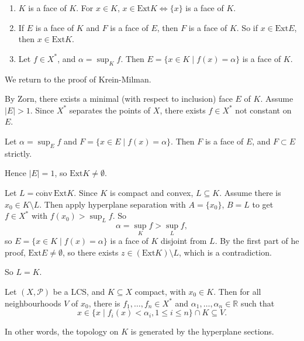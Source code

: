 \documentclass[12pt]{article}
\begin{document}
\begin{exbox}
	\begin{enumerate}
		\item $K$ is a face of $K$. For $x \in K$, $x \in \mathrm{Ext} K \iff \{x\}$ is a face of $K$.
		\item If $E$ is a face of $K$ and $F$ is a face of $E$, then $F$ is a face of $K$. So if $x \in \mathrm{Ext} E$, then $x \in \mathrm{Ext} K$.
		\item Let $f \in X^{\ast}$, and $\alpha = \sup_K f$. Then $E = \{x \in K \mid f(x) = \alpha\}$ is a face of $K$.
	\end{enumerate}
\end{exbox}

We return to the proof of Krein-Milman.

\begin{proofbox}
	By Zorn, there exists a minimal (with respect to inclusion) face $E$ of $K$. Assume $|E| > 1$. Since $X^{\ast}$ separates the points of $X$, there exists $f \in X^{\ast}$ not constant on $E$.

	Let $\alpha = \sup_E f$ and $F = \{x \in E \mid f(x) = \alpha\}$. Then $F$ is a face of $E$, and $F \subset E$ strictly.

	Hence $|E| = 1$, so $\mathrm{Ext} K \neq \emptyset$.

	Let $L = \overline{\mathrm{conv}} \, \mathrm{Ext} K$. Since $K$ is compact and convex, $L \subseteq K$. Assume there is $x_0 \in K \setminus L$. Then apply hyperplane separation with $A = \{x_0\}$, $B = L$ to get $f \in X^{\ast}$ with $f(x_0) > \sup_L f$. So
	\[
	\alpha = \sup_K f > \sup_L f,
	\]
	so $E = \{x \in K \mid f(x) =\alpha\}$ is a face of $K$ disjoint from $L$. By the first part of he proof, $\mathrm{Ext} E \neq \emptyset$, so there exists $z \in (\mathrm{Ext} K) \setminus L$, which is a contradiction.

	So $L = K$.
\end{proofbox}

\begin{lemma}
	Let $(X, \mathcal{P})$ be a LCS, and $K \subseteq X$ compact, with $x_0 \in K$. Then for all neighbourhoods $V$ of $x_0$, there is $f_1, \ldots, f_n \in X^{\ast}$ and $\alpha_1, \ldots, \alpha_n \in \mathbb{R}$ such that
	\[
		x \in \{x \mid f_i(x) < \alpha_i, 1 \leq i \leq n\} \cap K \subseteq V.
	\]
\end{lemma}

In other words, the topology on $K$ is generated by the hyperplane sections.
\end{document}
